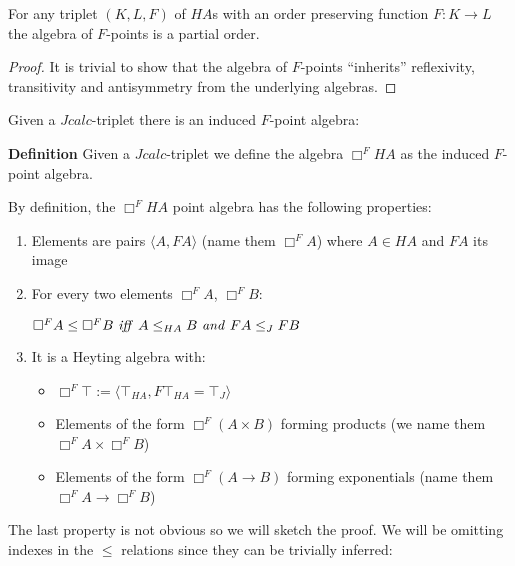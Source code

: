 \begin{theorem}
    For any triplet $(K, L, F)$ of $HA$s with an order 
    preserving function $F:K\rightarrow L$
    the algebra of $F$-points is a partial order.
\end{theorem}
\begin{proof}
    It is trivial to show that the algebra of $F$-points ``inherits'' reflexivity, 
    transitivity and antisymmetry from the underlying algebras.
\end{proof}

Given a $Jcalc$-triplet there is an induced $F$-point algebra:
\begin{mdframed}
    \textbf{Definition}
    Given a $Jcalc$-triplet we define the algebra  $\Box^{F}HA$ as the induced $F$-point algebra.
\end{mdframed}
By definition, the $\Box^{F}HA$ point algebra has the following properties:
\begin{enumerate}
    \item Elements are pairs $\langle A, FA\rangle$ (name them $\Box^{F}A$) where $A\in HA$ and $FA$ its image
    \item For every two elements $\Box^{F}A$, $\Box^{F}B$:

    $\Box^{F}A \le\Box^{F}B \text{ \textit{iff} } A\le_{HA}B 
    \text{ \textit{and} } FA\le_J FB $ 
    
    \item It is a Heyting algebra with:
    \begin{itemize}
        \item $\Box^F\top := \langle \top_{HA}, F\top_{HA}=\top_J \rangle$ 
        \item Elements of the form $\Box^F (A \times B)$ 
        forming products (we name them $\Box^F A\times \Box^F B$)
        \item Elements of the form $\Box^F ( A\rightarrow B)$ 
        forming exponentials (name them $\Box^F{A}\rightarrow \Box^F B$)
    \end{itemize}
\end{enumerate}
The last property is not obvious so we will sketch the proof. We will be
omitting indexes in the $\le$ relations since they can be trivially inferred:
\begin{theorem}
\end{theorem}
